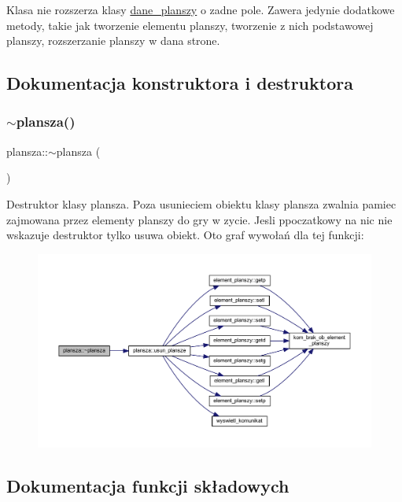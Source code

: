 Klasa nie rozszerza klasy \mbox{\hyperlink{classdane__planszy}{dane\+\_\+planszy}} o zadne pole. Zawera jedynie dodatkowe metody, takie jak tworzenie elementu planszy, tworzenie z nich podstawowej planszy, rozszerzanie planszy w dana strone. 

\subsection{Dokumentacja konstruktora i destruktora}
\mbox{\label{classplansza_a62b15c245954e816719b92ed241db439}} 
\subsubsection{\texorpdfstring{$\sim$plansza()}{~plansza()}}
{\footnotesize\ttfamily plansza\+::$\sim$plansza (\begin{DoxyParamCaption}{ }\end{DoxyParamCaption})}

Destruktor klasy plansza. Poza usunieciem obiektu klasy plansza zwalnia pamiec zajmowana przez elementy planszy do gry w zycie. Jesli ppoczatkowy na nic nie wskazuje destruktor tylko usuwa obiekt. Oto graf wywołań dla tej funkcji\+:
\nopagebreak
\begin{figure}[H]
\begin{center}
\leavevmode
\includegraphics[width=350pt]{classplansza_a62b15c245954e816719b92ed241db439_cgraph}
\end{center}
\end{figure}


\subsection{Dokumentacja funkcji składowych}
\mbox{\label{classplansza_a0400f244095fd65517b118194f6c5d9c}} 
